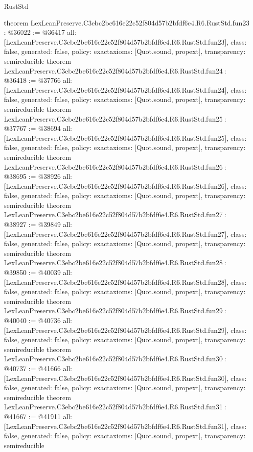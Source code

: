 \begin{lexlean}{RustStd}
\begin{coremodule}
{}
theorem LexLeanPreserve.C3ebc2be616e22c52f804d57b2bfdf6e4.R6.RustStd.fun23 : @36022 := @36417 {
  all: [LexLeanPreserve.C3ebc2be616e22c52f804d57b2bfdf6e4.R6.RustStd.fun23],
  class: false,
  generated: false,
  policy: exact{axioms: [Quot.sound, propext]},
  transparency: semireducible
}
theorem LexLeanPreserve.C3ebc2be616e22c52f804d57b2bfdf6e4.R6.RustStd.fun24 : @36418 := @37766 {
  all: [LexLeanPreserve.C3ebc2be616e22c52f804d57b2bfdf6e4.R6.RustStd.fun24],
  class: false,
  generated: false,
  policy: exact{axioms: [Quot.sound, propext]},
  transparency: semireducible
}
theorem LexLeanPreserve.C3ebc2be616e22c52f804d57b2bfdf6e4.R6.RustStd.fun25 : @37767 := @38694 {
  all: [LexLeanPreserve.C3ebc2be616e22c52f804d57b2bfdf6e4.R6.RustStd.fun25],
  class: false,
  generated: false,
  policy: exact{axioms: [Quot.sound, propext]},
  transparency: semireducible
}
theorem LexLeanPreserve.C3ebc2be616e22c52f804d57b2bfdf6e4.R6.RustStd.fun26 : @38695 := @38926 {
  all: [LexLeanPreserve.C3ebc2be616e22c52f804d57b2bfdf6e4.R6.RustStd.fun26],
  class: false,
  generated: false,
  policy: exact{axioms: [Quot.sound, propext]},
  transparency: semireducible
}
theorem LexLeanPreserve.C3ebc2be616e22c52f804d57b2bfdf6e4.R6.RustStd.fun27 : @38927 := @39849 {
  all: [LexLeanPreserve.C3ebc2be616e22c52f804d57b2bfdf6e4.R6.RustStd.fun27],
  class: false,
  generated: false,
  policy: exact{axioms: [Quot.sound, propext]},
  transparency: semireducible
}
theorem LexLeanPreserve.C3ebc2be616e22c52f804d57b2bfdf6e4.R6.RustStd.fun28 : @39850 := @40039 {
  all: [LexLeanPreserve.C3ebc2be616e22c52f804d57b2bfdf6e4.R6.RustStd.fun28],
  class: false,
  generated: false,
  policy: exact{axioms: [Quot.sound, propext]},
  transparency: semireducible
}
theorem LexLeanPreserve.C3ebc2be616e22c52f804d57b2bfdf6e4.R6.RustStd.fun29 : @40040 := @40736 {
  all: [LexLeanPreserve.C3ebc2be616e22c52f804d57b2bfdf6e4.R6.RustStd.fun29],
  class: false,
  generated: false,
  policy: exact{axioms: [Quot.sound, propext]},
  transparency: semireducible
}
theorem LexLeanPreserve.C3ebc2be616e22c52f804d57b2bfdf6e4.R6.RustStd.fun30 : @40737 := @41666 {
  all: [LexLeanPreserve.C3ebc2be616e22c52f804d57b2bfdf6e4.R6.RustStd.fun30],
  class: false,
  generated: false,
  policy: exact{axioms: [Quot.sound, propext]},
  transparency: semireducible
}
theorem LexLeanPreserve.C3ebc2be616e22c52f804d57b2bfdf6e4.R6.RustStd.fun31 : @41667 := @41911 {
  all: [LexLeanPreserve.C3ebc2be616e22c52f804d57b2bfdf6e4.R6.RustStd.fun31],
  class: false,
  generated: false,
  policy: exact{axioms: [Quot.sound, propext]},
  transparency: semireducible
}
\end{coremodule}
\end{lexlean}

